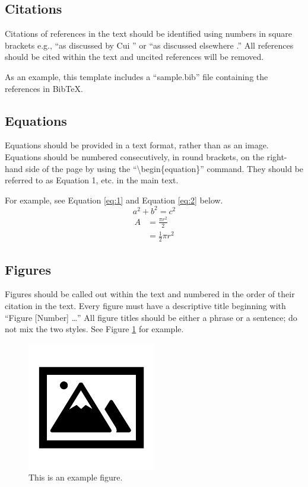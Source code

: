 \documentclass{article}
\begin{document}
\subsection*{Citations}
Citations of references in the text should be identified using numbers in square brackets e.g., ``as discussed by Cui \cite{Cui1}'' or ``as discussed elsewhere \cite{Cui1,Ninomiya1,Li1,Wang1,Yang1}.'' All references should be cited within the text and uncited references will be removed. 

As an example, this template includes a ``sample.bib'' file containing the references in BibTeX.

\subsection*{Equations}
Equations should be provided in a text format, rather than as an image. Equations should be numbered consecutively, in round brackets, on the right-hand side of the page by using the ``\textbackslash begin\{equation\}'' command. They should be referred to as Equation 1, etc. in the main text.

\medskip For example, see Equation \ref{eq:1} and Equation \ref{eq:2} below.
\begin{equation} \label{eq:1}
    a^2 + b^2 = c^2
\end{equation}
\begin{equation} \label{eq:2}
\begin{split}
A & = \frac{\pi r^2}{2} \\
 & = \frac{1}{2} \pi r^2
\end{split}
\end{equation}

\subsection*{Figures}
Figures should be called out within the text and numbered in the order of their citation in the text. Every figure must have a descriptive title beginning with ``Figure [Number] …'' All figure titles should be either a phrase or a sentence; do not mix the two styles. See Figure \ref{fig:1} for example.
\begin{figure}[h]
    \centering
    \includegraphics[width=0.5\textwidth]{./img/fig 1}
    \caption{This is an example figure.}
    \label{fig:1}
\end{figure}
\end{document}
